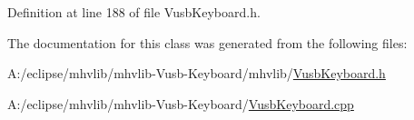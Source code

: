 Definition at line 188 of file Vusb\-Keyboard.\-h.



The documentation for this class was generated from the following files\-:\begin{DoxyCompactItemize}
\item 
A\-:/eclipse/mhvlib/mhvlib-\/\-Vusb-\/\-Keyboard/mhvlib/\hyperlink{_vusb_keyboard_8h}{Vusb\-Keyboard.\-h}\item 
A\-:/eclipse/mhvlib/mhvlib-\/\-Vusb-\/\-Keyboard/\hyperlink{_vusb_keyboard_8cpp}{Vusb\-Keyboard.\-cpp}\end{DoxyCompactItemize}
